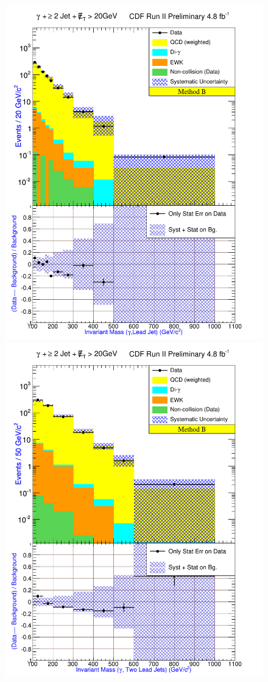 \documentclass[12pt,twoside,letterpaper,doublespace]{article}
\begin{document}
\begin{figure}[h!]
{\includegraphics[keepaspectratio=true, scale=\figScale]{G30JetsMet20_MtdB_plot2_InvMass_pj1.pdf}}
{\includegraphics[keepaspectratio=true, scale=\figScale]{G30JetsMet20_MtdB_plot2_InvMass_pj1j2.pdf}}

\end{figure}
\end{document}

